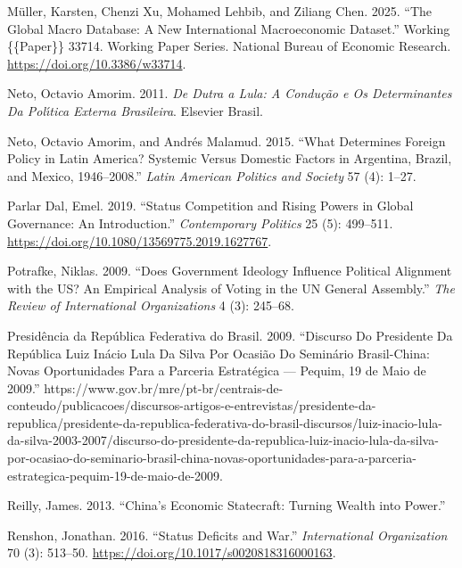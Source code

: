 \documentclass[
  12pt,
]{article}
\newlength{\cslhangindent}
\newenvironment{CSLReferences}[2] %
 {\begin{list}{}{%
  \setlength{\itemindent}{0pt}
  \setlength{\leftmargin}{0pt}
  \setlength{\parsep}{0pt}
  \ifodd #1
   \setlength{\leftmargin}{\cslhangindent}
   \setlength{\itemindent}{-1\cslhangindent}
  \fi
  \setlength{\itemsep}{#2\baselineskip}}}
 {\end{list}}
\begin{document}
\begin{CSLReferences}{1}{0}
Müller, Karsten, Chenzi Xu, Mohamed Lehbib, and Ziliang Chen. 2025.
{``The Global Macro Database: A New International Macroeconomic
Dataset.''} Working \{\{Paper\}\} 33714. Working Paper Series. National
Bureau of Economic Research. \url{https://doi.org/10.3386/w33714}.

Neto, Octavio Amorim. 2011. \emph{De {Dutra} a {Lula}: A Condu{ç}{ã}o e
Os Determinantes Da Pol{ı́}tica Externa Brasileira}. Elsevier Brasil.

Neto, Octavio Amorim, and Andrés Malamud. 2015. {``What Determines
Foreign Policy in Latin America? {Systemic} Versus Domestic Factors in
Argentina, Brazil, and Mexico, 1946--2008.''} \emph{Latin American
Politics and Society} 57 (4): 1--27.

Parlar Dal, Emel. 2019. {``Status Competition and Rising Powers in
Global Governance: An Introduction.''} \emph{Contemporary Politics} 25
(5): 499--511. \url{https://doi.org/10.1080/13569775.2019.1627767}.

Potrafke, Niklas. 2009. {``Does Government Ideology Influence Political
Alignment with the {US}? {An} Empirical Analysis of Voting in the {UN
General Assembly}.''} \emph{The Review of International Organizations} 4
(3): 245--68.

Presidência da República Federativa do Brasil. 2009. {``Discurso Do
{Presidente} Da {Rep{ú}blica Luiz In{á}cio Lula} Da {Silva} Por
Ocasi{ã}o Do {Semin{á}rio Brasil-China}: {Novas} Oportunidades Para a
Parceria Estrat{é}gica --- {Pequim}, 19 de Maio de 2009.''}
https://www.gov.br/mre/pt-br/centrais-de-conteudo/publicacoes/discursos-artigos-e-entrevistas/presidente-da-republica/presidente-da-republica-federativa-do-brasil-discursos/luiz-inacio-lula-da-silva-2003-2007/discurso-do-presidente-da-republica-luiz-inacio-lula-da-silva-por-ocasiao-do-seminario-brasil-china-novas-oportunidades-para-a-parceria-estrategica-pequim-19-de-maio-de-2009.

Reilly, James. 2013. {``China's Economic Statecraft: Turning Wealth into
Power.''}

Renshon, Jonathan. 2016. {``Status {Deficits} and {War}.''}
\emph{International Organization} 70 (3): 513--50.
\url{https://doi.org/10.1017/s0020818316000163}.


\end{CSLReferences}
\end{document}
